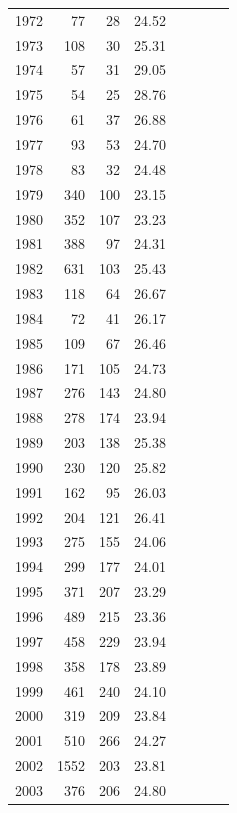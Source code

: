 \documentclass[12pt,]{article}
\begin{document}
\begin{table}[ht]
\begin{tabular}{rrrrllll}
  1972 &  77 &  28 & 24.52 &  &  &  &  \\ 
  1973 & 108 &  30 & 25.31 &  &  &  &  \\ 
  1974 &  57 &  31 & 29.05 &  &  &  &  \\ 
  1975 &  54 &  25 & 28.76 &  &  &  &  \\ 
  1976 &  61 &  37 & 26.88 &  &  &  &  \\ 
  1977 &  93 &  53 & 24.70 &  &  &  &  \\ 
  1978 &  83 &  32 & 24.48 &  &  &  &  \\ 
  1979 & 340 & 100 & 23.15 &  &  &  &  \\ 
  1980 & 352 & 107 & 23.23 &  &  &  &  \\ 
  1981 & 388 &  97 & 24.31 &  &  &  &  \\ 
  1982 & 631 & 103 & 25.43 &  &  &  &  \\ 
  1983 & 118 &  64 & 26.67 &  &  &  &  \\ 
  1984 &  72 &  41 & 26.17 &  &  &  &  \\ 
  1985 & 109 &  67 & 26.46 &  &  &  &  \\ 
  1986 & 171 & 105 & 24.73 &  &  &  &  \\ 
  1987 & 276 & 143 & 24.80 &  &  &  &  \\ 
  1988 & 278 & 174 & 23.94 &  &  &  &  \\ 
  1989 & 203 & 138 & 25.38 &  &  &  &  \\ 
  1990 & 230 & 120 & 25.82 &  &  &  &  \\ 
  1991 & 162 &  95 & 26.03 &  &  &  &  \\ 
  1992 & 204 & 121 & 26.41 &  &  &  &  \\ 
  1993 & 275 & 155 & 24.06 &  &  &  &  \\ 
  1994 & 299 & 177 & 24.01 &  &  &  &  \\ 
  1995 & 371 & 207 & 23.29 &  &  &  &  \\ 
  1996 & 489 & 215 & 23.36 &  &  &  &  \\ 
  1997 & 458 & 229 & 23.94 &  &  &  &  \\ 
  1998 & 358 & 178 & 23.89 &  &  &  &  \\ 
  1999 & 461 & 240 & 24.10 &  &  &  &  \\ 
  2000 & 319 & 209 & 23.84 &  &  &  &  \\ 
  2001 & 510 & 266 & 24.27 &  &  &  &  \\ 
  2002 & 1552 & 203 & 23.81 &  &  &  &  \\ 
  2003 & 376 & 206 & 24.80 &  &  &  &  \\ 

\end{tabular}
\end{table}
\end{document}
